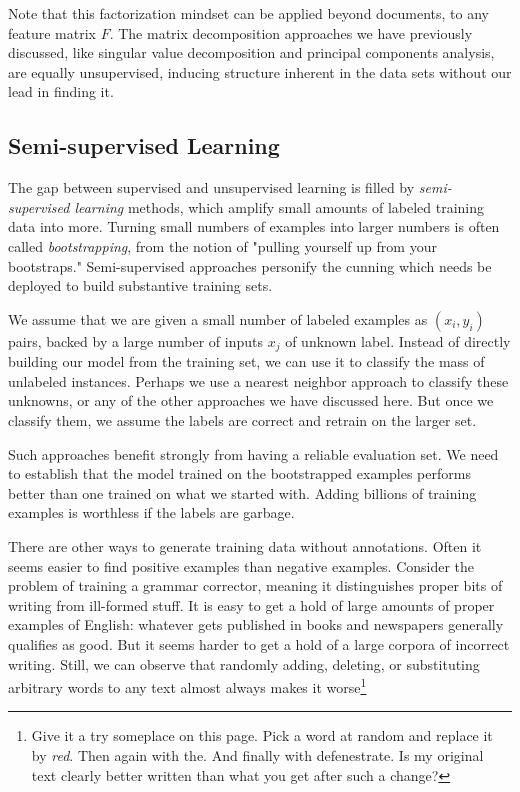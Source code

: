 \documentclass[10pt]{article}
\begin{document}
\begin{enumerate}
Note that this factorization mindset can be applied beyond documents, to any feature matrix $F$. The matrix decomposition approaches we have previously discussed, like singular value decomposition and principal components analysis, are equally unsupervised, inducing structure inherent in the data sets without our lead in finding it.

\subsection{Semi-supervised Learning}
The gap between supervised and unsupervised learning is filled by \textit{semi-supervised learning} methods, which amplify small amounts of labeled training data into more. Turning small numbers of examples into larger numbers is often called \textit{bootstrapping}, from the notion of "pulling yourself up from your bootstraps." Semi-supervised approaches personify the cunning which needs be deployed to build substantive training sets.

We assume that we are given a small number of labeled examples as $(x_{i}, y_{i})$ pairs, backed by a large number of inputs $x_{j}$ of unknown label. Instead of directly building our model from the training set, we can use it to classify the mass of unlabeled instances. Perhaps we use a nearest neighbor approach to classify these unknowns, or any of the other approaches we have discussed here. But once we classify them, we assume the labels are correct and retrain on the larger set.

Such approaches benefit strongly from having a reliable evaluation set. We need to establish that the model trained on the bootstrapped examples performs better than one trained on what we started with. Adding billions of training examples is worthless if the labels are garbage.

There are other ways to generate training data without annotations. Often it seems easier to find positive examples than negative examples. Consider the problem of training a grammar corrector, meaning it distinguishes proper bits of writing from ill-formed stuff. It is easy to get a hold of large amounts of proper examples of English: whatever gets published in books and newspapers generally qualifies as good. But it seems harder to get a hold of a large corpora of incorrect writing. Still, we can observe that randomly adding, deleting, or substituting arbitrary words to any text almost always makes it worse\footnote{Give it a try someplace on this page. Pick a word at random and replace it by \textit{red}. Then again with the. And finally with defenestrate. Is my original text clearly better written than what you get after such a change?}


\end{enumerate}
\end{document}
